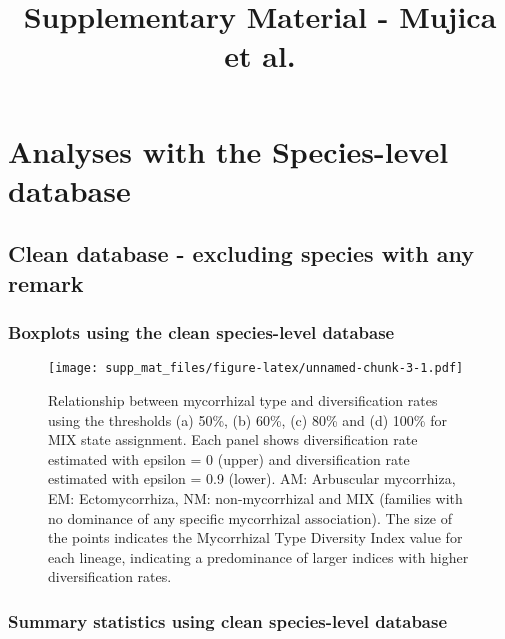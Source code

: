 \documentclass[]{article}
\title{Supplementary Material - Mujica et al.}
\author{}
\date{}
\begin{document}
\maketitle

\setcounter{table}{0}  \renewcommand{\thetable}{S\arabic{table}} \setcounter{figure}{0} \renewcommand{\thefigure}{S\arabic{figure}}

\hypertarget{analyses-with-the-species-level-database}{%
\section{Analyses with the Species-level
database}\label{analyses-with-the-species-level-database}}

\hypertarget{clean-database---excluding-species-with-any-remark}{%
\subsection{Clean database - excluding species with any
remark}\label{clean-database---excluding-species-with-any-remark}}

\hypertarget{boxplots-using-the-clean-species-level-database}{%
\subsubsection{Boxplots using the clean species-level
database}\label{boxplots-using-the-clean-species-level-database}}

\begin{figure}
\centering
\texttt{[image: supp\_mat\_files/figure-latex/unnamed-chunk-3-1.pdf]}
\caption{Relationship between mycorrhizal type and diversification rates
using the thresholds (a) 50\%, (b) 60\%, (c) 80\% and (d) 100\% for MIX
state assignment. Each panel shows diversification rate estimated with
epsilon = 0 (upper) and diversification rate estimated with epsilon =
0.9 (lower). AM: Arbuscular mycorrhiza, EM: Ectomycorrhiza, NM:
non-mycorrhizal and MIX (families with no dominance of any specific
mycorrhizal association). The size of the points indicates the
Mycorrhizal Type Diversity Index value for each lineage, indicating a
predominance of larger indices with higher diversification rates.}
\end{figure}

\hypertarget{summary-statistics-using-clean-species-level-database}{%
\subsubsection{Summary statistics using clean species-level
database}\label{summary-statistics-using-clean-species-level-database}}
\end{document}
